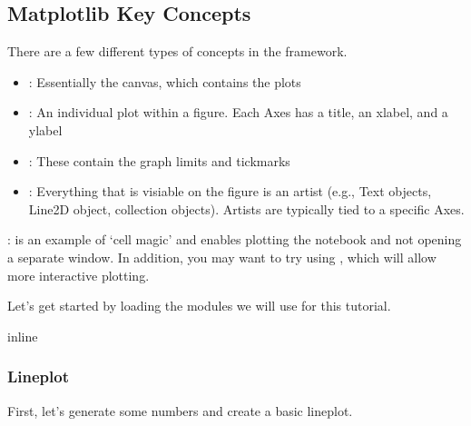 \documentclass[letterpaper,10pt,english]{sphinxmanual}
\begin{document}
\subsection{Matplotlib Key Concepts}
\label{\detokenize{content/Introduction_to_Plotting:matplotlib-key-concepts}}
There are a few different types of concepts in the  framework.
\begin{itemize}
\item {} 
: Essentially the canvas, which contains the plots

\item {} 
: An individual plot within a figure. Each Axes has a title, an x\sphinxhyphen{}label, and a y\sphinxhyphen{}label

\item {} 
: These contain the graph limits and tickmarks

\item {} 
: Everything that is visiable on the figure is an artist (e.g., Text objects, Line2D object, collection objects). Artists are typically tied to a specific Axes.

\end{itemize}

:  is an example of ‘cell magic’ and enables plotting  the notebook and not opening a separate window. In addition, you may want to try using , which will allow more interactive plotting.

Let’s get started by loading the modules we will use for this tutorial.

\begin{sphinxVerbatim}[commandchars=\\\{\}]
 inline 

   
   
   
   
\end{sphinxVerbatim}


\subsubsection{Lineplot}
\label{\detokenize{content/Introduction_to_Plotting:lineplot}}
First, let’s generate some numbers and create a basic lineplot.
\end{document}
